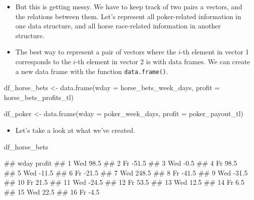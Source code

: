 \documentclass[
]{book}
\newenvironment{Shaded}{\begin{snugshade}}{\end{snugshade}}
\newcommand{\AttributeTok}[1]{\textcolor[rgb]{0.77,0.63,0.00}{#1}}
\newcommand{\FunctionTok}[1]{\textcolor[rgb]{0.00,0.00,0.00}{#1}}
\newcommand{\NormalTok}[1]{#1}
\newcommand{\OtherTok}[1]{\textcolor[rgb]{0.56,0.35,0.01}{#1}}
\providecommand{\tightlist}{%
  \setlength{\itemsep}{0pt}\setlength{\parskip}{0pt}}
\begin{document}
\begin{itemize}
\item
  But this is getting messy. We have to keep track of two pairs a vectors, and the relations between them. Let's represent all poker-related information in one data structure, and all horse race-related information in another structure.
\item
  The best way to represent a pair of vectors where the \(i\)-th element in vector 1 corresponds to the \(i\)-th element in vector 2 is with data frames. We can create a new data frame with the function \texttt{data.frame()}.
\end{itemize}

\begin{Shaded}
\begin{Highlighting}[]
\NormalTok{df\_horse\_bets }\OtherTok{\textless{}{-}} 
  \FunctionTok{data.frame}\NormalTok{(}\AttributeTok{wday =}\NormalTok{ horse\_bets\_week\_days, }
             \AttributeTok{profit =}\NormalTok{ horse\_bets\_profits\_tl)}
\end{Highlighting}
\end{Shaded}

\begin{Shaded}
\begin{Highlighting}[]
\NormalTok{df\_poker }\OtherTok{\textless{}{-}} 
  \FunctionTok{data.frame}\NormalTok{(}\AttributeTok{wday =}\NormalTok{ poker\_week\_days, }
             \AttributeTok{profit =}\NormalTok{ poker\_payout\_tl)}
\end{Highlighting}
\end{Shaded}

\begin{itemize}
\tightlist
\item
  Let's take a look at what we've created.
\end{itemize}

\begin{Shaded}
\begin{Highlighting}[]
\NormalTok{df\_horse\_bets}
\end{Highlighting}
\end{Shaded}

\begin{Shaded}
\begin{Highlighting}[]
\NormalTok{\#\#    wday profit}
\NormalTok{\#\# 1   Wed   98.5}
\NormalTok{\#\# 2    Fr  {-}51.5}
\NormalTok{\#\# 3   Wed   {-}0.5}
\NormalTok{\#\# 4    Fr   98.5}
\NormalTok{\#\# 5   Wed  {-}11.5}
\NormalTok{\#\# 6    Fr  {-}21.5}
\NormalTok{\#\# 7   Wed  248.5}
\NormalTok{\#\# 8    Fr  {-}41.5}
\NormalTok{\#\# 9   Wed  {-}31.5}
\NormalTok{\#\# 10   Fr   21.5}
\NormalTok{\#\# 11  Wed  {-}24.5}
\NormalTok{\#\# 12   Fr   53.5}
\NormalTok{\#\# 13  Wed   12.5}
\NormalTok{\#\# 14   Fr    6.5}
\NormalTok{\#\# 15  Wed   22.5}
\NormalTok{\#\# 16   Fr   {-}4.5}
\end{Highlighting}
\end{Shaded}
\end{document}
